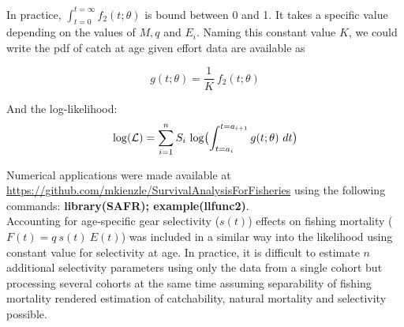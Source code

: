 In practice, $\int_{t=0}^{t=\infty} f_{2}(t; \theta)$ is bound between 0 and 1. It takes a specific value depending on the values of $M, q $ and $E_{i}$. Naming this constant value $K$, we could write the pdf of catch at age given effort data are available as

\begin{equation}
g(t; \theta) = \frac{1}{K} \ f_{2}(t; \theta)
\end{equation}

And the log-likelihood:
\begin{equation}
{\rm log}(\mathcal{L}) = \sum_{i=1}^{n} S_{i} \ {\rm log} \bigl ( \int_{t=a_{i}}^{t=a_{i+1}} g(t; \theta) \ dt \bigr )
\end{equation}

Numerical applications were made available at \url{https://github.com/mkienzle/SurvivalAnalysisForFisheries} using the following commands: {\bf library(SAFR); example(llfunc2)}.\\

Accounting for age-specific gear selectivity ($s(t)$) effects on fishing mortality ($F(t) = q \ s(t) \ E(t)$) was included in a similar way into the likelihood using constant value for selectivity at age. In practice, it is difficult to estimate $n$ additional selectivity parameters using only the data from a single cohort but processing several cohorts at the same time assuming separability of fishing mortality rendered estimation of catchability, natural mortality and selectivity possible.
